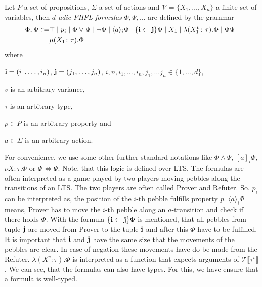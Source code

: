 \begin{definition}
    Let $P$ a set of propositions, $\Sigma$ a set of actions and $\mathcal{V} = \{X_1, \dots, X_n\}$ a finite set
    of variables, then
    \emph{$d$-adic PHFL formulas} $\Phi, \Psi,\dots$ are defined by the grammar
    \begin{align*}
        \Phi,\Psi\Coloneqq&\top \mid p_i \mid \Phi \vee \Psi \mid \neg \Phi \mid \langle a \rangle_i \Phi \mid
        \{\emph{i}
        \leftarrow \emph{j}\} \Phi \mid X_1 \mid \lambda (X_1^v\colon\tau).\Phi \mid \Phi \Psi\mid  \\
        &\mu (X_1\colon\tau).\Phi
    \end{align*}
    where
    \begin{compactitem}
        \item $\emph{i} = (i_1,\dots, i_n)$, $\emph{j} = (j_1,\dots,j_n)$, $i, n, i_1,\dots,i_n, j_1, \dots j_n \in
        \{1, \dots, d\}$,
        \item $v$ is an arbitrary variance,
        \item $\tau$ is an arbitrary type,
        \item $p \in P$ is an arbitrary property and
        \item $a \in \Sigma$ is an arbitrary action.
    \end{compactitem}
\end{definition}

For convenience, we use some other further standard notations like $\Phi \wedge \Psi$, $[a]_i\Phi$, $\nu
X \colon \tau.\Phi$ or $\Phi \Leftrightarrow \Psi$. Note, that this logic is defined over LTS. The formulas are
often interpreted as a game played by two players moving pebbles along the transitions of an LTS. The two players
are often called Prover and Refuter. So, $p_i$ can be interpreted as, the position of the $i$-th pebble fulfills
property $p$. $\langle a \rangle_i \Phi$ means, Prover has to move the $i$-th pebble along an $a$-transition and
check if there holds $\Phi$. With the formula $\{\emph{i}\leftarrow\emph{j}\} \Phi$ is mentioned, that all pebbles
from tuple $\emph{j}$ are moved from Prover to the tuple $\emph{i}$ and after this $\Phi$ have to be fulfilled. It is
important that $\emph{i}$ and $\emph{j}$ have the same size that the movements of the pebbles are clear. In case of
negation these movements have do be made from the Refuter. $\lambda (X^v\colon\tau).\Phi$ is interpreted as a
function that expects arguments of $\mathcal{T}\llbracket\tau^v\rrbracket$. We can see, that the formulas can also
have types. For this, we have ensure that a formula is well-typed.

